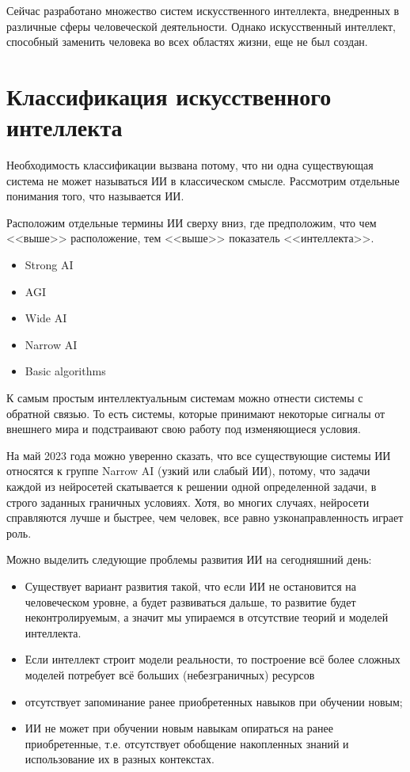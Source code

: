 \documentclass[bachelor,och,referat]{SCWorks_corrected}
\begin{document}
Сейчас разработано множество систем искусственного интеллекта, внедренных в различные сферы человеческой деятельности. Однако искусственный интеллект, способный заменить человека во всех областях жизни, еще не был создан.

\section{Классификация искусственного интеллекта}

Необходимость классификации вызвана потому, что ни одна существующая система не может называться ИИ в классическом смысле. Рассмотрим отдельные понимания того, что называется ИИ.\cite{N3}

Расположим отдельные термины ИИ сверху вниз, где предположим, что чем <<выше>> расположение, тем <<выше>> показатель <<интеллекта>>.\begin{itemize}
    \item Strong AI
    \item AGI
    \item Wide AI
    \item Narrow AI
    \item Basic algorithms    
\end{itemize}

К самым простым интеллектуальным системам можно отнести системы с обратной связью. То есть системы, которые принимают некоторые сигналы от внешнего мира и подстраивают свою работу под изменяющиеся условия.

На май 2023 года можно уверенно сказать, что все существующие системы ИИ относятся к группе Narrow AI (узкий или слабый ИИ), потому, что задачи каждой из нейросетей скатывается к решении одной определенной задачи, в строго заданных граничных условиях. Хотя, во многих случаях, нейросети справляются лучше и быстрее, чем человек, все равно узконаправленность играет роль.

Можно выделить следующие проблемы развития ИИ на сегодняшний день:\begin{itemize}
    \item Существует вариант развития такой, что если ИИ не остановится на человеческом уровне, а будет развиваться дальше, то развитие будет неконтролируемым, а значит мы упираемся в отсутствие теорий и моделей интеллекта.
    \item Если интеллект строит модели реальности, то построение всё более сложных моделей потребует всё больших (небезграничных) ресурсов
    \item отсутствует запоминание ранее приобретенных навыков при обучении новым; 
    \item ИИ не может при обучении новым навыкам опираться на ранее приобретенные, т.е. отсутствует обобщение накопленных знаний и использование их в разных контекстах.\cite{N9}
\end{itemize}
\end{document}
